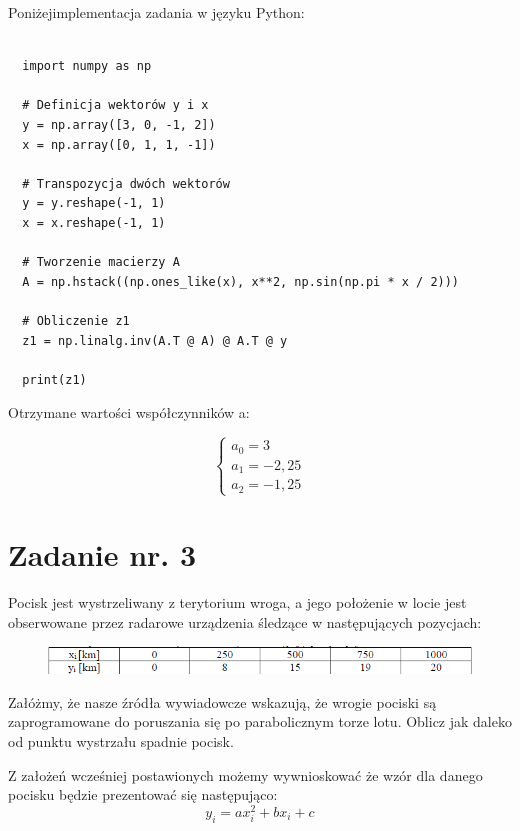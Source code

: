 \documentclass{article}
\begin{document}
Poniżejimplementacja zadania w języku Python:

\begin{lstlisting}

  import numpy as np

  # Definicja wektorów y i x
  y = np.array([3, 0, -1, 2])
  x = np.array([0, 1, 1, -1])
  
  # Transpozycja dwóch wektorów
  y = y.reshape(-1, 1)
  x = x.reshape(-1, 1)
  
  # Tworzenie macierzy A
  A = np.hstack((np.ones_like(x), x**2, np.sin(np.pi * x / 2)))
  
  # Obliczenie z1
  z1 = np.linalg.inv(A.T @ A) @ A.T @ y
  
  print(z1)

\end{lstlisting}
\newpage

Otrzymane wartości współczynników a:

\begin{equation}
  \begin{cases}
    a_0=3\\
    a_1=-2,25\\
    a_2=-1,25
  \end{cases}
\end{equation}


\section{Zadanie nr. 3}
Pocisk jest wystrzeliwany z terytorium wroga, a jego położenie w locie jest obserwowane
przez radarowe urządzenia śledzące w następujących pozycjach:
\begin{figure}[h]
  \includegraphics[scale=0.7]{tabelka.png}
  \centering
  \end{figure}

Załóżmy, że nasze źródła wywiadowcze wskazują, że wrogie pociski są zaprogramowane do
poruszania się po parabolicznym torze lotu. Oblicz jak daleko od punktu wystrzału spadnie
pocisk.

Z założeń wcześniej postawionych możemy wywnioskować że wzór dla danego pocisku będzie prezentować się następująco:
\begin{equation}
  y_i = ax_i^2 + bx_i + c
\end{equation}
\end{document}
